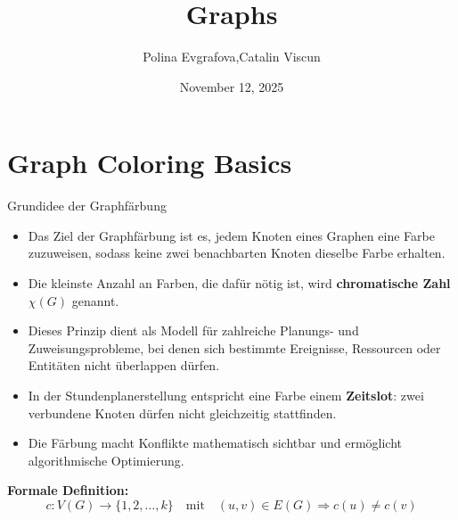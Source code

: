 \documentclass[10pt]{beamer}
\begin{document}
\title{Graphs}
\author{Polina Evgrafova,Catalin Viscun}
\date{November 12, 2025}

\begin{frame}
    \maketitle
\end{frame}


\section{Graph Coloring Basics}

\begin{frame}{Grundidee der Graphfärbung}
    \small
    \begin{itemize}
        \item Das Ziel der Graphfärbung ist es, jedem Knoten eines Graphen eine Farbe zuzuweisen, sodass keine zwei benachbarten Knoten dieselbe Farbe erhalten.
        \item Die kleinste Anzahl an Farben, die dafür nötig ist, wird \textbf{chromatische Zahl} $\chi(G)$ genannt.
        \item Dieses Prinzip dient als Modell für zahlreiche Planungs- und Zuweisungsprobleme, bei denen sich bestimmte Ereignisse, Ressourcen oder Entitäten nicht überlappen dürfen.
        \item In der Stundenplanerstellung entspricht eine Farbe einem \textbf{Zeitslot}: zwei verbundene Knoten dürfen nicht gleichzeitig stattfinden.
        \item Die Färbung macht Konflikte mathematisch sichtbar und ermöglicht algorithmische Optimierung.
    \end{itemize}

    \vspace{1em}
    \textbf{Formale Definition:}
    \[
        c: V(G) \rightarrow \{1, 2, \dots, k\} \quad \text{mit} \quad (u,v) \in E(G) \Rightarrow c(u) \neq c(v)
    \]
\end{frame}
\end{document}
